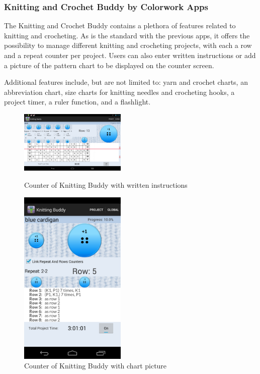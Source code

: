 \subsubsection{Knitting and Crochet Buddy by Colorwork Apps}
The Knitting and Crochet Buddy contains a plethora of features related to knitting and crocheting. As is the standard with the previous apps, it offers the possibility to manage different knitting and crocheting projects, with each a row and a repeat counter per project. Users can also enter written instructions or add a picture of the pattern chart to be displayed on the counter screen.

Additional features include, but are not limited to: yarn and crochet charts, an abbreviation chart, size charts for knitting needles and crocheting hooks, a project timer, a ruler function, and a flashlight.

\begin{figure}[H]
\centering
\begin{minipage}{.5\textwidth}
  \centering
  \includegraphics[width=2in]{images/image04.png}
  \caption[Counter of Knitting Buddy with written instructions ]{Counter of Knitting Buddy with written instructions}
  \label{fig_knittingbuddy1}
\end{minipage}%
\begin{minipage}{.5\textwidth}
  \centering
  \includegraphics[width=2in]{images/image05.png}
  \caption[Counter of Knitting Buddy with chart picture ]{Counter of Knitting Buddy with chart picture}
  \label{fig_knittingbuddy}
\end{minipage}
\end{figure}

